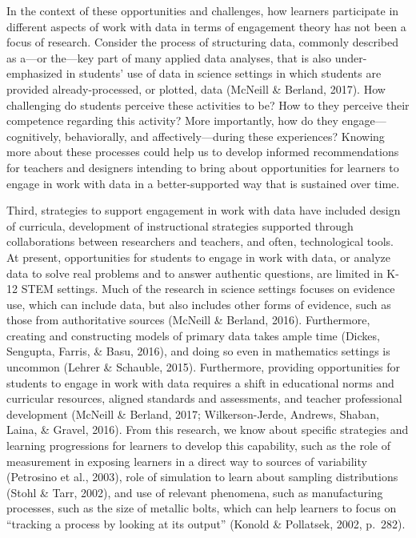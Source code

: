 \documentclass[]{book}
\theoremstyle{definition}
\theoremstyle{definition}
\theoremstyle{definition}
\theoremstyle{remark}
\begin{document}
In the context of these opportunities and challenges, how learners
participate in different aspects of work with data in terms of
engagement theory has not been a focus of research. Consider the process
of structuring data, commonly described as a---or the---key part of many
applied data analyses, that is also under-emphasized in students' use of
data in science settings in which students are provided
already-processed, or plotted, data (McNeill \& Berland, 2017). How
challenging do students perceive these activities to be? How to they
perceive their competence regarding this activity? More importantly, how
do they engage---cognitively, behaviorally, and affectively---during
these experiences? Knowing more about these processes could help us to
develop informed recommendations for teachers and designers intending to
bring about opportunities for learners to engage in work with data in a
better-supported way that is sustained over time.

Third, strategies to support engagement in work with data have included
design of curricula, development of instructional strategies supported
through collaborations between researchers and teachers, and often,
technological tools. At present, opportunities for students to engage in
work with data, or analyze data to solve real problems and to answer
authentic questions, are limited in K-12 STEM settings. Much of the
research in science settings focuses on evidence use, which can include
data, but also includes other forms of evidence, such as those from
authoritative sources (McNeill \& Berland, 2016). Furthermore, creating
and constructing models of primary data takes ample time (Dickes,
Sengupta, Farris, \& Basu, 2016), and doing so even in mathematics
settings is uncommon (Lehrer \& Schauble, 2015). Furthermore, providing
opportunities for students to engage in work with data requires a shift
in educational norms and curricular resources, aligned standards and
assessments, and teacher professional development (McNeill \& Berland,
2017; Wilkerson-Jerde, Andrews, Shaban, Laina, \& Gravel, 2016). From
this research, we know about specific strategies and learning
progressions for learners to develop this capability, such as the role
of measurement in exposing learners in a direct way to sources of
variability (Petrosino et al., 2003), role of simulation to learn about
sampling distributions (Stohl \& Tarr, 2002), and use of relevant
phenomena, such as manufacturing processes, such as the size of metallic
bolts, which can help learners to focus on ``tracking a process by
looking at its output'' (Konold \& Pollatsek, 2002, p.~282).
\end{document}
